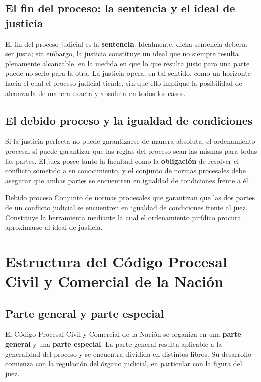 \documentclass[12pt,oneside]{book}
\begin{document}
\subsection{El fin del proceso: la sentencia y el ideal de justicia}

El fin del proceso judicial es la \textbf{sentencia}. Idealmente, dicha sentencia debería ser justa; sin embargo, la justicia constituye un ideal que no siempre resulta plenamente alcanzable, en la medida en que lo que resulta justo para una parte puede no serlo para la otra. La justicia opera, en tal sentido, como un horizonte hacia el cual el proceso judicial tiende, sin que ello implique la posibilidad de alcanzarla de manera exacta y absoluta en todos los casos.

\subsection{El debido proceso y la igualdad de condiciones}

Si la justicia perfecta no puede garantizarse de manera absoluta, el ordenamiento procesal sí puede garantizar que las reglas del proceso sean las mismas para todas las partes. El juez posee tanto la facultad como la \textbf{obligación} de resolver el conflicto sometido a su conocimiento, y el conjunto de normas procesales debe asegurar que ambas partes se encuentren en igualdad de condiciones frente a él.

\begin{definition}{Debido proceso}
Conjunto de normas procesales que garantizan que las dos partes de un conflicto judicial se encuentren en igualdad de condiciones frente al juez. Constituye la herramienta mediante la cual el ordenamiento jurídico procura aproximarse al ideal de justicia.
\end{definition}

\section{Estructura del Código Procesal Civil y Comercial de la Nación}

\subsection{Parte general y parte especial}

El Código Procesal Civil y Comercial de la Nación se organiza en una \textbf{parte general} y una \textbf{parte especial}. La parte general resulta aplicable a la generalidad del proceso y se encuentra dividida en distintos libros. Su desarrollo comienza con la regulación del órgano judicial, en particular con la figura del juez.
\end{document}
